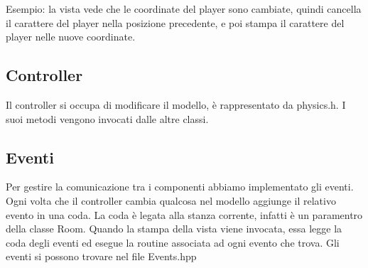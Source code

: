 \documentclass{article}
\begin{document}
Esempio: la vista vede che le coordinate del player sono cambiate, quindi cancella il carattere del player nella posizione precedente, e poi stampa il carattere del player nelle nuove coordinate.
\subsection{Controller}
Il controller si occupa di modificare il modello, è rappresentato da physics.h. I suoi metodi vengono invocati dalle altre classi.
\subsection{Eventi}
Per gestire la comunicazione tra i componenti abbiamo implementato gli eventi. Ogni volta che il controller cambia qualcosa nel modello aggiunge il relativo evento in una coda. La coda è legata alla stanza corrente, infatti è un paramentro della classe Room. Quando la stampa della vista viene invocata, essa legge la coda degli eventi ed esegue la routine associata ad ogni evento che trova.
Gli eventi si possono trovare nel file Events.hpp
\end{document}
